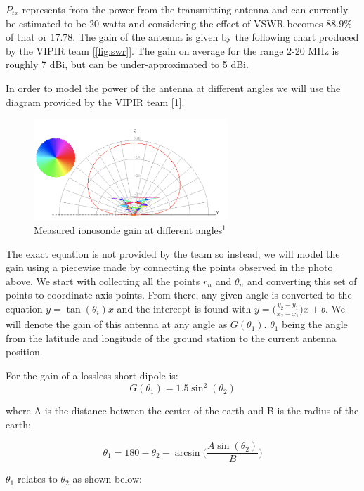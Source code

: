 \documentclass[12pt]{article}
\begin{document}
$P_{tx}$ represents from the power from the transmitting antenna and can currently be estimated to be 20 watts and considering the effect of VSWR becomes $88.9 \%$ of that or 17.78. The gain of the antenna is given by  the following chart produced by the VIPIR team [\ref{fig:swr}]. The gain on average for the range 2-20 MHz is roughly 7 dBi, but can be under-approximated to 5 dBi.

In order to model the power of the antenna at different angles we will use the diagram provided by the VIPIR team [\ref{fig:angle}]. 

\begin{figure}[h]
\centering
\includegraphics[width=0.65\textwidth]{vipir_two}
\caption[Caption for LOF]{Measured ionosonde gain at different angles\protect$^1$}
\label{fig:angle}
\end{figure}
The exact equation is not provided by the team so instead, we will model the gain using a piecewise made by connecting the points observed in the photo above. We start with collecting all the points $r_n$ and $\theta_n$ and converting this set of points to coordinate axis points. From there, any given angle is converted to the equation $y = \tan(\theta_i)x$ and the intercept is found with $y = \big( \frac{y_2-y_1}{x_2-x_1} \big)x+b$. We will denote the gain of this antenna at any angle as $G(\theta_1)$. $\theta_1$ being the angle from the latitude and longitude of the ground station to the current antenna position.



For the gain of a lossless short dipole is: $$G(\theta_1)=1.5\sin^2(\theta_2)$$

where A is the distance between the center of the earth and B is the radius of the earth:

$$
\theta_1 = 180 - \theta_2  - \arcsin \Big( \frac{A \sin(\theta_2)}{B} \Big)
$$



\newpage

$\theta_1$ relates to $\theta_2$ as shown below:
\end{document}
